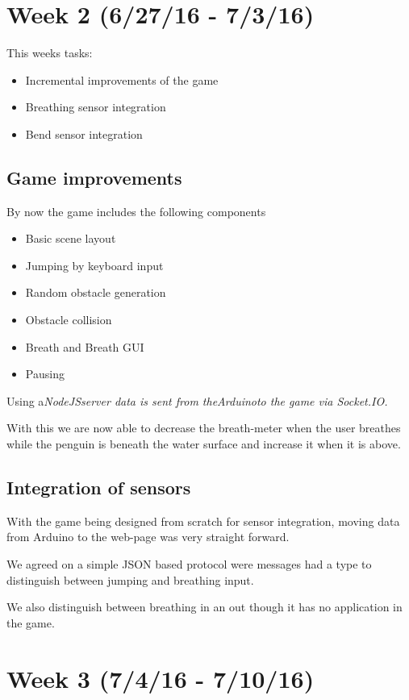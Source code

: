\documentclass{article}
\begin{document}
\section{Week 2 (6/27/16 - 7/3/16)}
    This weeks tasks:
    \begin{itemize}
        \item Incremental improvements of the game
        \item Breathing sensor integration
        \item Bend sensor integration
    \end{itemize}

    \subsection{Game improvements}
        By now the game includes the following components
        \begin{itemize}
            \item Basic scene layout
            \item Jumping by keyboard input
            \item Random obstacle generation
            \item Obstacle collision
            \item Breath and Breath GUI
            \item Pausing
        \end{itemize}

        Using a\em NodeJS\em server data is sent from the\em Arduino\em to the game via \em Socket.IO\em.

        With this we are now able to decrease the breath-meter when the user breathes while the penguin is beneath the water surface and increase it when it is above.

    \subsection{Integration of sensors}
        With the game being designed from scratch for sensor integration, moving data from Arduino to the web-page was very straight forward.

        We agreed on a simple JSON based protocol were messages had a type to distinguish between jumping and breathing input.

        We also distinguish between breathing in an out though it has no application in the game.

\section{Week 3 (7/4/16 - 7/10/16)}
\end{document}
